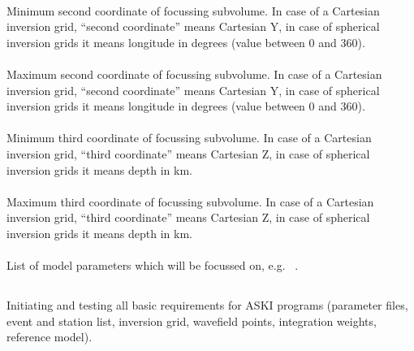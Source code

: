 \paragraph{}
Minimum second coordinate of focussing subvolume. In case of a Cartesian inversion grid, ``second coordinate''
means Cartesian Y, in case of spherical inversion grids it means longitude in degrees (value between 0 and 360).
\paragraph{}
Maximum second coordinate of focussing subvolume. In case of a Cartesian inversion grid, ``second  coordinate''
means Cartesian Y, in case of spherical inversion grids it means longitude in degrees (value between 0 and 360).
\paragraph{}
Minimum third coordinate of focussing subvolume. In case of a Cartesian inversion grid, ``third coordinate''
means Cartesian Z, in case of spherical inversion grids it means depth in km.
\paragraph{}
Maximum third coordinate of focussing subvolume. In case of a Cartesian inversion grid, ``third  coordinate''
means Cartesian Z, in case of spherical inversion grids it means depth in km.
\paragraph{}
List of model parameters which will be focussed on, e.g.\  . 
%
%
\subsection{} \label{programs_scripts,sec:bin_prog,sec:in_basics}
Initiating and testing all basic requirements for ASKI programs (parameter files, event and station list, inversion grid, wavefield points, integration weights, reference model).


